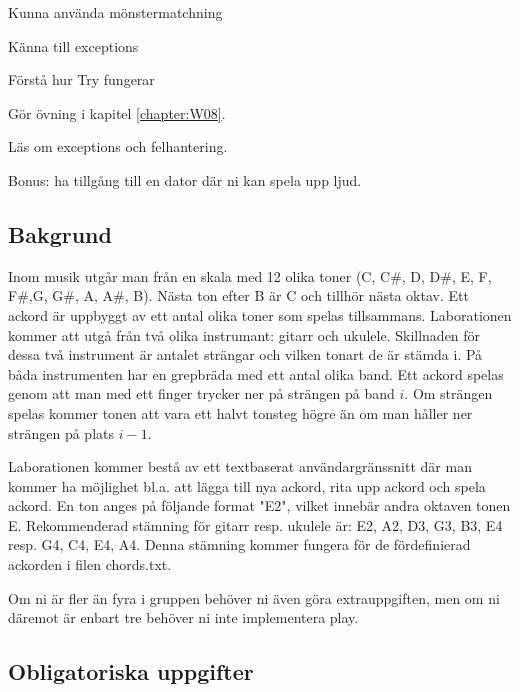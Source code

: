 

\Lab{\LabWeekEIGHT}

\begin{Goals}
\item Kunna använda mönstermatchning
\item Känna till exceptions
\item Förstå hur Try fungerar

\end{Goals}

\begin{Preparations}
\item Gör övning {\tt \ExeWeekEIGHT} i kapitel \ref{chapter:W08}.
\item Läs om exceptions och felhantering.
\item Bonus: ha tillgång till en dator där ni kan spela upp ljud.
\end{Preparations}

\subsection{Bakgrund}
Inom musik utgår man från en skala med 12 olika toner (C, C\#, D, D\#, E, F, F\#,G, G\#, A, A\#, B). Nästa ton efter B är C och tillhör nästa oktav. Ett ackord är uppbyggt av ett antal olika toner som spelas tillsammans. Laborationen kommer att utgå från två olika instrumant: gitarr och ukulele. Skillnaden för dessa två instrument är antalet strängar och vilken tonart de är stämda i. På båda instrumenten har en grepbräda med ett antal olika band. Ett ackord spelas genom att man med ett finger trycker ner på strängen på band $i$. Om strängen spelas kommer tonen att vara ett halvt tonsteg högre än om man håller ner strängen på plats $i-1$.

Laborationen kommer bestå av ett textbaserat användargränssnitt där man kommer ha möjlighet bl.a. att lägga till nya ackord, rita upp ackord och spela ackord. En ton anges på följande format "E2", vilket innebär andra oktaven tonen E. Rekommenderad stämning för gitarr resp. ukulele är: E2, A2, D3, G3, B3, E4 resp. G4, C4, E4, A4. Denna stämning kommer fungera för de fördefinierad ackorden i filen chords.txt.

Om ni är fler än fyra i gruppen behöver ni även göra extrauppgiften, men om ni däremot är enbart tre behöver ni inte implementera play.

\subsection{Obligatoriska uppgifter}

